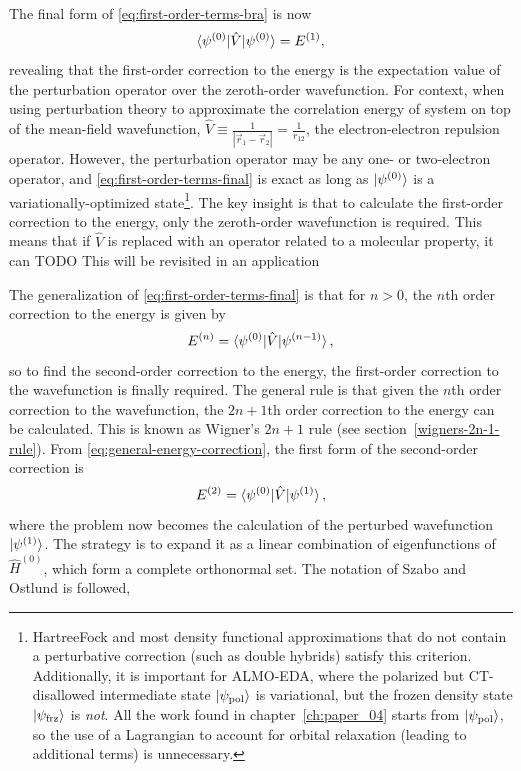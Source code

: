 \documentclass[%
class = book,%
crop = false,%
float = true,%
multi = true,%
preview = false,%
]{standalone}
\let\cite\autocite
\newcommand\hf{Hartree\textendash{}Fock\xspace}%
\begin{document}
The final form of \eqref{eq:first-order-terms-bra} is now
\begin{equation}
  \label{eq:first-order-terms-final}
  \braket{\psi^{(0)} | \hat{V} | \psi^{(0)}} = E^{(1)},
\end{equation}
revealing that the first-order correction to the energy is the expectation value of the perturbation operator over the zeroth-order wavefunction. For context, when using perturbation theory to approximate the correlation energy of system on top of the mean-field wavefunction, \(\hat{V} \equiv \frac{1}{|\vec{r}_{1} - \vec{r}_{2}|} = \frac{1}{r_{12}}\), the electron-electron repulsion operator. However, the perturbation operator may be any one- or two-electron operator, and \eqref{eq:first-order-terms-final} is exact as long as \(\ket{\psi^{(0)}}\) is a variationally-optimized state\footnote{\hf and most density functional approximations that do not contain a perturbative correction (such as double hybrids) satisfy this criterion. Additionally, it is important for ALMO-EDA, where the polarized but CT-disallowed intermediate state \(\ket{\psi_{\text{pol}}}\) is variational, but the frozen density state \(\ket{\psi_{\text{frz}}}\) is \emph{not}. All the work found in chapter~\ref{ch:paper_04} starts from \(\ket{\psi_{\text{pol}}}\), so the use of a Lagrangian to account for orbital relaxation (leading to additional terms) is unnecessary.}. The key insight is that to calculate the first-order correction to the energy, only the zeroth-order wavefunction is required. This means that if \(\hat{V}\) is replaced with an operator related to a molecular property, it can TODO This will be revisited in an application

The generalization of \eqref{eq:first-order-terms-final} is that for \(n > 0\), the \(n\)th order correction to the energy is given by
\begin{equation}
  \label{eq:general-energy-correction}
  E^{(n)} = \braket{\psi^{(0)}|\hat{V}|\psi^{(n-1)}},
\end{equation}
so to find the second-order correction to the energy, the first-order correction to the wavefunction is finally required. The general rule is that given the \(n\)th order correction to the wavefunction, the \(2n+1\)th order correction to the energy can be calculated. This is known as Wigner's \(2n+1\) rule (see section~\ref{wigners-2n-1-rule}). From \eqref{eq:general-energy-correction}, the first form of the second-order correction is
\begin{equation}
  \label{eq:second-order-correction-first-form}
  E^{(2)} = \braket{\psi^{(0)}|\hat{V}|\psi^{(1)}},
\end{equation}
where the problem now becomes the calculation of the perturbed wavefunction \(\ket{\psi^{(1)}}\). The strategy is to expand it as a linear combination of eigenfunctions of \(\hat{H}^{(0)}\), which form a complete orthonormal set. The notation of Szabo and Ostlund\cite{szabo1989modern} is followed,
\end{document}
